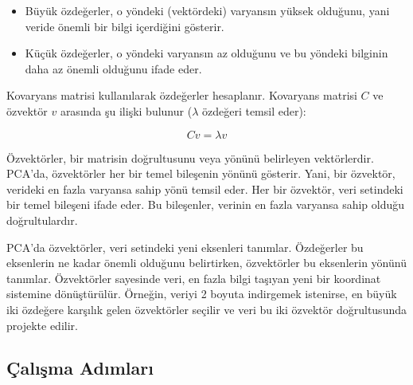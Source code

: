\begin{itemize}
    \item Büyük özdeğerler, o yöndeki (vektördeki) varyansın yüksek olduğunu, yani veride önemli bir bilgi içerdiğini gösterir.
    \item Küçük özdeğerler, o yöndeki varyansın az olduğunu ve bu yöndeki bilginin daha az önemli olduğunu ifade eder.
\end{itemize}

Kovaryans matrisi kullanılarak özdeğerler hesaplanır. Kovaryans matrisi $C$ ve özvektör $v$ arasında şu ilişki bulunur ($\lambda$ özdeğeri temsil eder):

\[ C v = \lambda v \]


Özvektörler, bir matrisin doğrultusunu veya yönünü belirleyen vektörlerdir. PCA'da, özvektörler her bir temel bileşenin yönünü gösterir. Yani, bir özvektör, verideki en fazla varyansa sahip yönü temsil eder. Her bir özvektör, veri setindeki bir temel bileşeni ifade eder. Bu bileşenler, verinin en fazla varyansa sahip olduğu doğrultulardır.

PCA'da özvektörler, veri setindeki yeni eksenleri tanımlar. Özdeğerler bu eksenlerin ne kadar önemli olduğunu belirtirken, özvektörler bu eksenlerin yönünü tanımlar. Özvektörler sayesinde veri, en fazla bilgi taşıyan yeni bir koordinat sistemine dönüştürülür. Örneğin, veriyi 2 boyuta indirgemek istenirse, en büyük iki özdeğere karşılık gelen özvektörler seçilir ve veri bu iki özvektör doğrultusunda projekte edilir.

\subsection{Çalışma Adımları}


